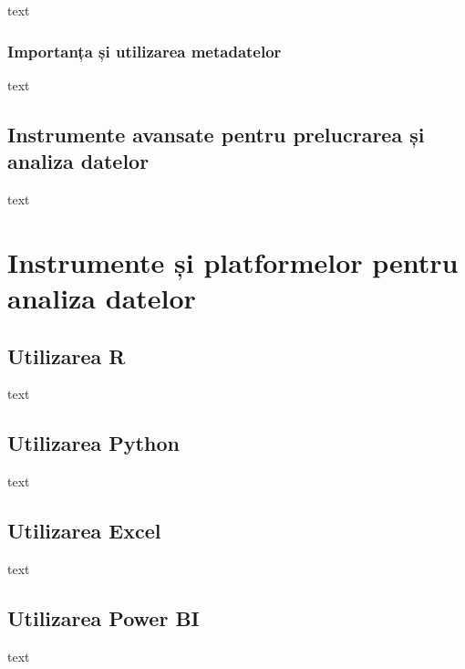 \documentclass[
  11pt,
  b5paper,
  nottoc]{book}
\begin{document}
text

\hypertarget{importanux21ba-ux219i-utilizarea-metadatelor}{%
\subsection{Importanța și utilizarea
metadatelor}\label{importanux21ba-ux219i-utilizarea-metadatelor}}

text

\hypertarget{instrumente-avansate-pentru-prelucrarea-ux219i-analiza-datelor}{%
\section{Instrumente avansate pentru prelucrarea și analiza
datelor}\label{instrumente-avansate-pentru-prelucrarea-ux219i-analiza-datelor}}

text


\hypertarget{cap2}{%
\chapter{Instrumente și platformelor pentru analiza
datelor}\label{cap2}}

\hypertarget{utilizarea-r}{%
\section{Utilizarea R}\label{utilizarea-r}}

text

\hypertarget{utilizarea-python}{%
\section{Utilizarea Python}\label{utilizarea-python}}

text

\hypertarget{utilizarea-excel}{%
\section{Utilizarea Excel}\label{utilizarea-excel}}

text

\hypertarget{utilizarea-power-bi}{%
\section{Utilizarea Power BI}\label{utilizarea-power-bi}}

text
\end{document}
